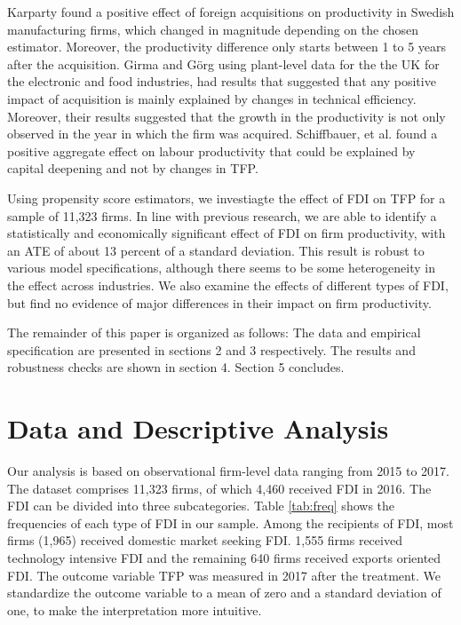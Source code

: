 \documentclass[a4paper,11pt]{scrartcl}
\begin{document}
Karparty found a positive effect of foreign acquisitions on productivity in Swedish manufacturing firms, which changed in magnitude depending on the chosen estimator. Moreover, the productivity difference only starts between 1 to 5 years after the acquisition. Girma and Görg using plant-level data for the the UK for the electronic and food industries, had results that suggested that any positive impact of acquisition is mainly explained by changes in technical efficiency. Moreover, their results suggested that the growth in the productivity is not only observed in the year in which the firm was acquired. Schiffbauer, et al. found a positive aggregate effect on labour productivity that could be explained by capital deepening and not by changes in TFP.

Using propensity score estimators, we investiagte the effect of FDI on TFP for a sample of 11,323 firms. In line with previous research, we are able to identify a statistically and economically significant effect of FDI on firm productivity, with an ATE of about 13 percent of a standard deviation. This result is robust to various model specifications, although there seems to be some heterogeneity in the effect across industries. We also examine the effects of different types of FDI, but find no evidence of major differences in their impact on firm productivity.

The remainder of this paper is organized as follows: The data and empirical specification are presented in sections 2 and 3 respectively. The results and robustness checks are shown in section 4. Section 5 concludes.

\section{Data and Descriptive Analysis}
Our analysis is based on observational firm-level data ranging from 2015 to 2017. The dataset comprises 11,323 firms, of which 4,460 received FDI in 2016. The FDI can be divided into three subcategories. Table \ref{tab:freq} shows the frequencies of each type of FDI in our sample. Among the recipients of FDI, most firms (1,965) received domestic market seeking FDI. 1,555 firms received technology intensive FDI and the remaining 640 firms received exports oriented FDI. The outcome variable TFP was measured in 2017 after the treatment. We standardize the outcome variable to a mean of zero and a standard deviation of one, to make the interpretation more intuitive. 
\end{document}
